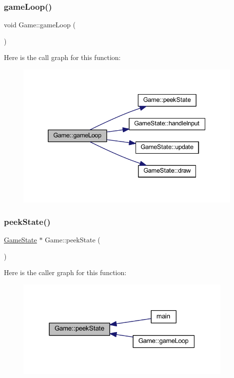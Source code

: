 \subsubsection{\texorpdfstring{game\+Loop()}{gameLoop()}}
{\footnotesize\ttfamily void Game\+::game\+Loop (\begin{DoxyParamCaption}{ }\end{DoxyParamCaption})}

Here is the call graph for this function\+:
\nopagebreak
\begin{figure}[H]
\begin{center}
\leavevmode
\includegraphics[width=332pt]{class_game_aede5f46c8c7bbbaf8459eeec397a11e7_cgraph}
\end{center}
\end{figure}
\mbox{\label{class_game_a6cdc6cb374ab8e7d8ac9b280284b3793}} 
\subsubsection{\texorpdfstring{peek\+State()}{peekState()}}
{\footnotesize\ttfamily \hyperlink{class_game_state}{Game\+State} $\ast$ Game\+::peek\+State (\begin{DoxyParamCaption}{ }\end{DoxyParamCaption})}

Here is the caller graph for this function\+:
\nopagebreak
\begin{figure}[H]
\begin{center}
\leavevmode
\includegraphics[width=303pt]{class_game_a6cdc6cb374ab8e7d8ac9b280284b3793_icgraph}
\end{center}
\end{figure}
\mbox{\label{class_game_a4b33dd67adef59bebadba8a234282c88}} 
